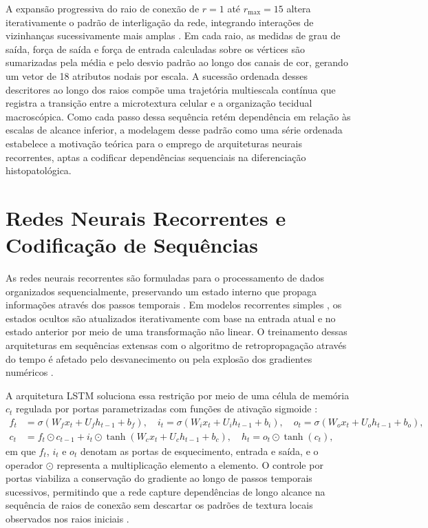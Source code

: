 A expansão progressiva do raio de conexão de $r = 1$ até $r_{\max} = 15$ altera iterativamente o padrão de interligação da rede, integrando interações de vizinhanças sucessivamente mais amplas \cite{Scabini_2020,CNT}. Em cada raio, as medidas de grau de saída, força de saída e força de entrada calculadas sobre os vértices são sumarizadas pela média e pelo desvio padrão ao longo dos canais de cor, gerando um vetor de 18 atributos nodais por escala. A sucessão ordenada desses descritores ao longo dos raios compõe uma trajetória multiescala contínua que registra a transição entre a microtextura celular e a organização tecidual macroscópica. Como cada passo dessa sequência retém dependência em relação às escalas de alcance inferior, a modelagem desse padrão como uma série ordenada estabelece a motivação teórica para o emprego de arquiteturas neurais recorrentes, aptas a codificar dependências sequenciais na diferenciação histopatológica.

\section{Redes Neurais Recorrentes e Codificação de Sequências}
\label{sec:rnn-topologicas}

As redes neurais recorrentes são formuladas para o processamento de dados organizados sequencialmente, preservando um estado interno que propaga informações através dos passos temporais \cite{lecun2015deep}. Em modelos recorrentes simples \cite{elman1990finding}, os estados ocultos são atualizados iterativamente com base na entrada atual e no estado anterior por meio de uma transformação não linear. O treinamento dessas arquiteturas em sequências extensas com o algoritmo de retropropagação através do tempo é afetado pelo desvanecimento ou pela explosão dos gradientes numéricos \cite{bengio1994learning}.

A arquitetura LSTM soluciona essa restrição por meio de uma célula de memória $c_t$ regulada por portas parametrizadas com funções de ativação sigmoide \cite{hochreiter1997long,gers2000learning}:
\begin{align}
f_t &= \sigma\!\left(W_f x_t + U_f h_{t-1} + b_f\right), \quad i_t = \sigma\!\left(W_i x_t + U_i h_{t-1} + b_i\right), \quad o_t = \sigma\!\left(W_o x_t + U_o h_{t-1} + b_o\right), \label{eq:lstm-portas}\\
c_t &= f_t \odot c_{t-1} + i_t \odot \tanh\!\left(W_c x_t + U_c h_{t-1} + b_c\right), \quad h_t = o_t \odot \tanh(c_t), \label{eq:lstm-estado}
\end{align}
em que $f_t$, $i_t$ e $o_t$ denotam as portas de esquecimento, entrada e saída, e o operador $\odot$ representa a multiplicação elemento a elemento. O controle por portas viabiliza a conservação do gradiente ao longo de passos temporais sucessivos, permitindo que a rede capture dependências de longo alcance na sequência de raios de conexão sem descartar os padrões de textura locais observados nos raios iniciais \cite{lin2022mslstm,greff2017lstm}.

